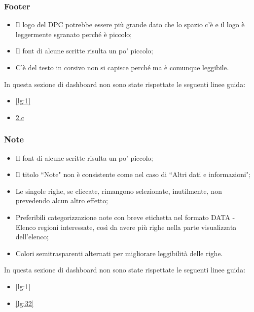 \subsubsection{Footer}
\begin{itemize}
    \item Il logo del DPC potrebbe essere più grande dato che lo spazio c'è e il logo è leggermente sgranato perché è piccolo;
    \item Il font di alcune scritte risulta un po' piccolo;
    \item C'è del testo in corsivo non si capisce perché ma è comunque leggibile.
\end{itemize}
In questa sezione di dashboard non sono state rispettate le seguenti linee guida:
\begin{itemize}
    \item \ref{lg:1}
    \item \hyperref[lg:2.c]{2.c}
\end{itemize}

\subsubsection{Note}
\begin{itemize}
    \item Il font di alcune scritte risulta un po' piccolo;
    \item Il titolo ``Note" non è consistente come nel caso di ``Altri dati e informazioni";
    \item Le singole righe, se cliccate, rimangono selezionate, inutilmente, non prevedendo alcun altro effetto;
    \item Preferibili categorizzazione note con breve etichetta nel formato DATA - Elenco regioni interessate, così da avere più righe nella parte visualizzata dell'elenco;
    \item Colori semitrasparenti alternati per migliorare leggibilità delle righe.
\end{itemize}
In questa sezione di dashboard non sono state rispettate le seguenti linee guida:
\begin{itemize}
    \item \ref{lg:1}
    \item \ref{lg:32}
\end{itemize}

